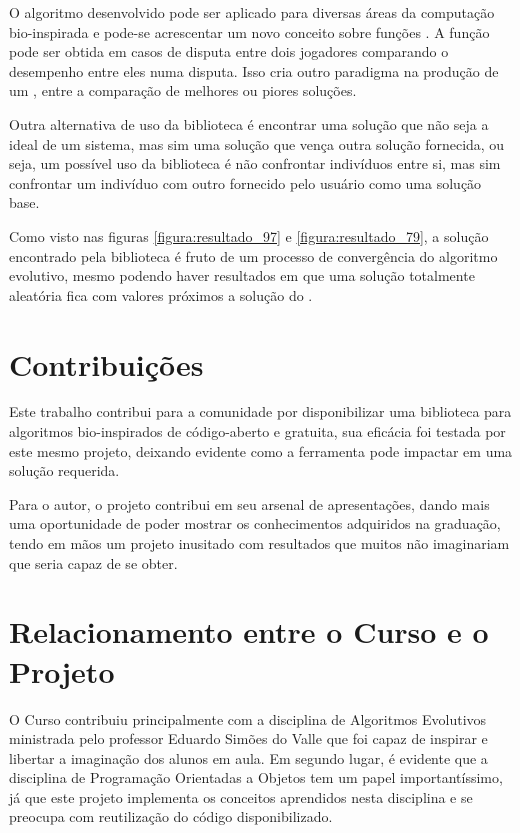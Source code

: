 O algoritmo desenvolvido pode ser aplicado para diversas áreas da computação bio-inspirada e pode-se acrescentar um novo conceito sobre funções \fitness. A função \fitness pode ser obtida em casos de disputa entre dois jogadores comparando o desempenho entre eles numa disputa. Isso cria outro paradigma na produção de um \SE, entre a comparação de melhores ou piores soluções.

Outra alternativa de uso da biblioteca é encontrar uma solução que não seja a ideal de um sistema, mas sim uma solução que vença outra solução fornecida, ou seja, um possível uso da biblioteca é não confrontar indivíduos entre si, mas sim confrontar um indivíduo com outro fornecido pelo usuário como uma solução base.

Como visto nas figuras \ref{figura:resultado_97} e \ref{figura:resultado_79}, a solução encontrado pela biblioteca é fruto de um processo de convergência do algoritmo evolutivo, mesmo podendo haver resultados em que uma solução totalmente aleatória fica com valores próximos a solução do \SE.

\section{Contribuições}

Este trabalho contribui para a comunidade por disponibilizar uma biblioteca para algoritmos bio-inspirados de código-aberto e gratuita, sua eficácia foi testada por este mesmo projeto, deixando evidente como a ferramenta pode impactar em uma solução requerida.

Para o autor, o projeto contribui em seu arsenal de apresentações, dando mais uma oportunidade de poder mostrar os conhecimentos adquiridos na graduação, tendo em mãos um projeto inusitado com resultados que muitos não imaginariam que seria capaz de se obter.

\section{Relacionamento entre o Curso e o Projeto}

O Curso contribuiu principalmente com a disciplina de Algoritmos Evolutivos ministrada pelo professor Eduardo Simões do Valle que foi capaz de inspirar e libertar a imaginação dos alunos em aula. Em segundo lugar, é evidente que a disciplina de Programação Orientadas a Objetos tem um papel importantíssimo, já que este projeto implementa os conceitos aprendidos nesta disciplina e se preocupa com reutilização do código disponibilizado.

